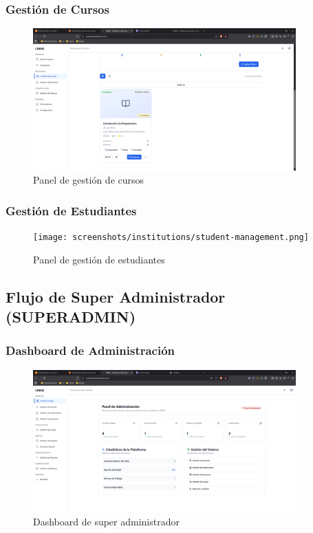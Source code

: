 \documentclass[12pt,a4paper]{article}
\begin{document}
\begin{enumerate}
\subsubsection{Gestión de Cursos}
\begin{figure}[H]
    \centering
    \includegraphics[width=0.9\textwidth]{screenshots/institutions/course-management.png}
    \caption{Panel de gestión de cursos}
    \label{fig:institution-courses}
\end{figure}

\subsubsection{Gestión de Estudiantes}
\begin{figure}[H]
    \centering
    \texttt{[image: screenshots/institutions/student-management.png]}
    \caption{Panel de gestión de estudiantes}
    \label{fig:institution-students}
\end{figure}

\subsection{Flujo de Super Administrador (SUPERADMIN)}

\subsubsection{Dashboard de Administración}
\begin{figure}[H]
    \centering
    \includegraphics[width=0.9\textwidth]{screenshots/admin/dashboard.png}
    \caption{Dashboard de super administrador}
    \label{fig:admin-dashboard}
\end{figure}


\end{enumerate}
\end{document}
